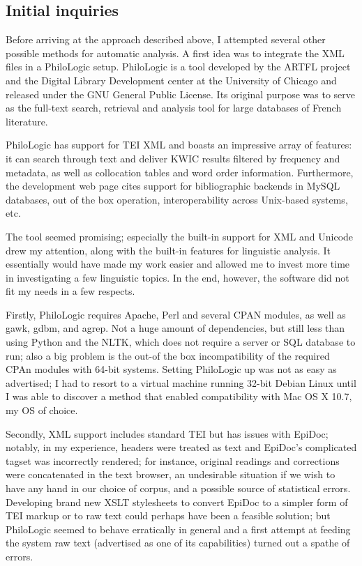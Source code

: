 \subsection{Initial inquiries}

Before arriving at the approach described above, I attempted several other
possible methods for automatic analysis. A first idea was to integrate the XML
files in a PhiloLogic setup.  PhiloLogic is a tool developed by the ARTFL
project and the Digital Library Development center at the University of Chicago
and released under the GNU General Public License. Its original purpose was to
serve as the full-text search, retrieval and analysis tool for large databases
of French literature.

PhiloLogic has support for TEI XML and boasts an impressive
array of features: it can search through text and deliver KWIC results
filtered by frequency and metadata, as well as collocation tables and word
order information.  Furthermore, the development web page cites support for
bibliographic backends in MySQL databases, out of the box operation,
interoperability across Unix-based systems, etc.

The tool seemed promising; especially the built-in support for XML and
Unicode drew my attention, along with the built-in features for linguistic
analysis. It essentially would have made my work easier and allowed me to
invest more time in investigating a few linguistic topics. In the end, however,
the software did not fit my needs in a few respects.

Firstly, PhiloLogic requires Apache, Perl and several CPAN modules, as well as
gawk, gdbm, and agrep.  Not a huge amount of dependencies, but still less than
using Python and the NLTK, which does not require a server or SQL database to
run; also a big problem is the out-of the box incompatibility of the required
CPAn  modules with 64-bit systems. Setting PhiloLogic up was not as
easy as advertised; I had to resort to a virtual machine running 32-bit Debian
Linux until I was able to discover a method that enabled compatibility with
Mac OS X 10.7, my OS of choice.

Secondly, XML support includes standard TEI  but has issues with EpiDoc; notably,
in my experience, headers were treated as text and EpiDoc's complicated tagset
was incorrectly rendered; for instance, original readings and corrections were
concatenated in the text browser, an undesirable situation if we wish to have
any hand in our choice of corpus, and a possible source of statistical errors.
Developing brand new XSLT stylesheets to convert EpiDoc to a simpler form of
TEI markup or to raw text could perhaps have been a feasible solution; but
PhiloLogic seemed to behave erratically in general and a first attempt at
feeding the system raw text (advertised as one of its capabilities) turned out
a spathe of errors.


